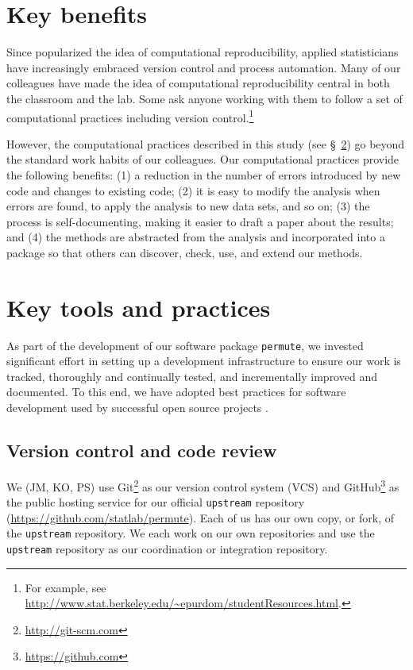 \documentclass[]{article}
\begin{document}
\section{Key benefits}

Since \citet{buckheit1995wavelab} popularized the idea of computational
reproducibility, applied statisticians have increasingly embraced version control
and process automation.
Many of our colleagues have made the idea of computational reproducibility
central in both the classroom and the lab.
Some ask anyone working with them to follow a set of computational practices
including version control.\footnote{
  For example, see
  \url{http://www.stat.berkeley.edu/~epurdom/studentResources.html}.
}

However, the computational practices described in this study
(see \S~\ref{key-tools}) go beyond the standard work habits of our colleagues.
Our computational practices provide the following benefits:
(1) a reduction in the number of errors introduced by new code and changes to
    existing code;
(2) it is easy to modify the analysis when errors are found, to apply the
    analysis to new data sets, and so on;
(3) the process is self-documenting, making it easier to draft a paper about
    the results; and
(4) the methods are abstracted from the analysis and incorporated into a
    package so that others can discover, check, use, and extend our methods.

\section{Key tools and practices}\label{key-tools}

As part of the development of our software package \texttt{permute}, we
invested significant effort in setting up a development infrastructure to
ensure our work is tracked, thoroughly and continually tested, and
incrementally improved and documented.
To this end, we have adopted best practices for software development used by
successful open source projects \citep{millman2014developing}.

\subsection{Version control and code review}

We (JM, KO, PS) use Git\footnote{\url{http://git-scm.com}} as our version
control system (VCS) and GitHub\footnote{\url{https://github.com}} as the
public hosting service for our official \texttt{upstream} repository
(\url{https://github.com/statlab/permute}).
Each of us has our own copy, or fork, of the \texttt{upstream} repository.
We each work on our own repositories and use the \texttt{upstream} repository
as our coordination or integration repository.
\end{document}
